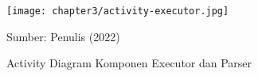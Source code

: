 
\begin{figure}[!h]
  \centering
  \texttt{[image: chapter3/activity-executor.jpg]}
  \caption{Activity Diagram Komponen Executor dan Parser} \label{fig:activity-executor}
  Sumber: Penulis (2022)
\end{figure}


